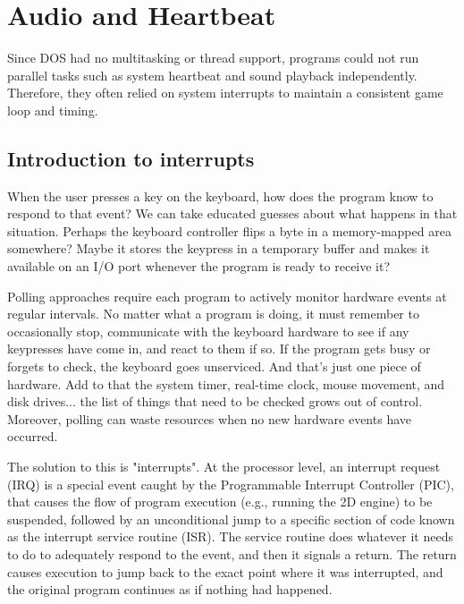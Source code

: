 \documentclass[book.tex]{subfiles}
\begin{document}
\section{Audio and Heartbeat} 
\label{audio_and_heartbeat}
Since DOS had no multitasking or thread support, programs could not run parallel tasks such as system heartbeat and sound playback independently. Therefore, they often relied on system interrupts to maintain a consistent game loop and timing.\\

\subsection{Introduction to interrupts}
When the user presses a key on the keyboard, how does the program know to respond to that event? We can take educated guesses about what happens in that situation. Perhaps the keyboard controller flips a byte in a memory-mapped area somewhere? Maybe it stores the keypress in a temporary buffer and makes it available on an I/O port whenever the program is ready to receive it?\\

\par
Polling approaches require each program to actively monitor hardware events at regular intervals. No matter what a program is doing, it must remember to occasionally stop, communicate with the keyboard hardware to see if any keypresses have come in, and react to them if so. If the program gets busy or forgets to check, the keyboard goes unserviced. And that's just one piece of hardware. Add to that the system timer, real-time clock, mouse movement, and disk drives... the list of things that need to be checked grows out of control. Moreover, polling can waste resources when no new hardware events have occurred.\\

\par
The solution to this is "interrupts". At the processor level, an interrupt request (IRQ) is a special event caught by the Programmable Interrupt Controller (PIC), that causes the flow of program execution (e.g., running the 2D engine) to be suspended, followed by an unconditional jump to a specific section of code known as the interrupt service routine (ISR). The service routine does whatever it needs to do to adequately respond to the event, and then it signals a return. The return causes execution to jump back to the exact point where it was interrupted, and the original program continues as if nothing had happened. \\
\end{document}
